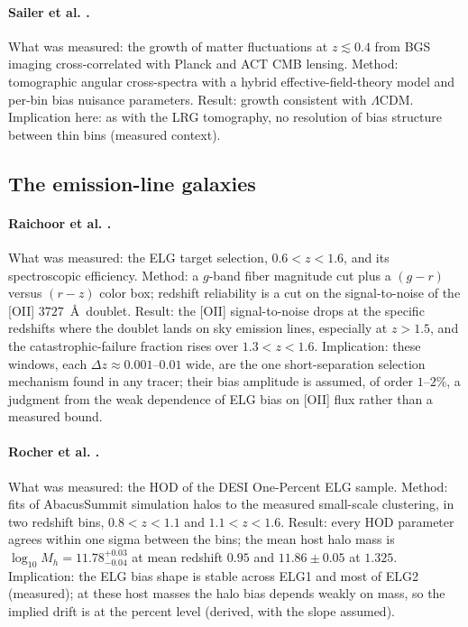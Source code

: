 \documentclass[11pt]{article}
\begin{document}
\paragraph{Sailer et al. \cite{Sailer2025}.}
What was measured: the growth of matter fluctuations at
$z \lesssim 0.4$ from BGS imaging cross-correlated with Planck and
ACT CMB lensing.  Method: tomographic angular cross-spectra with a
hybrid effective-field-theory model and per-bin bias nuisance
parameters.  Result: growth consistent with $\Lambda$CDM.
Implication here: as with the LRG tomography, no resolution of bias
structure between thin bins (measured context).

\subsection{The emission-line galaxies}

\paragraph{Raichoor et al. \cite{Raichoor2023}.}
What was measured: the ELG target selection, $0.6 < z < 1.6$, and
its spectroscopic efficiency.  Method: a $g$-band fiber magnitude
cut plus a $(g-r)$ versus $(r-z)$ color box; redshift reliability is
a cut on the signal-to-noise of the [OII] $3727$~\AA\ doublet.
Result: the [OII] signal-to-noise drops at the specific redshifts
where the doublet lands on sky emission lines, especially at
$z > 1.5$, and the catastrophic-failure fraction rises over
$1.3 < z < 1.6$.  Implication: these windows, each
$\Delta z \approx 0.001$--$0.01$ wide, are the one short-separation
selection mechanism found in any tracer; their bias amplitude is
assumed, of order $1$--$2\%$, a judgment from the weak dependence of
ELG bias on [OII] flux rather than a measured bound.

\paragraph{Rocher et al. \cite{Rocher2023}.}
What was measured: the HOD of the DESI One-Percent ELG sample.
Method: fits of AbacusSummit simulation halos to the measured
small-scale clustering, in two redshift bins, $0.8 < z < 1.1$ and
$1.1 < z < 1.6$.  Result: every HOD parameter agrees within one
sigma between the bins; the mean host halo mass is
$\log_{10} M_h = 11.78^{+0.03}_{-0.04}$ at mean redshift $0.95$ and
$11.86 \pm 0.05$ at $1.325$.  Implication: the ELG bias shape is
stable across ELG1 and most of ELG2 (measured); at these host masses
the halo bias depends weakly on mass, so the implied drift is at the
percent level (derived, with the slope assumed).
\end{document}
